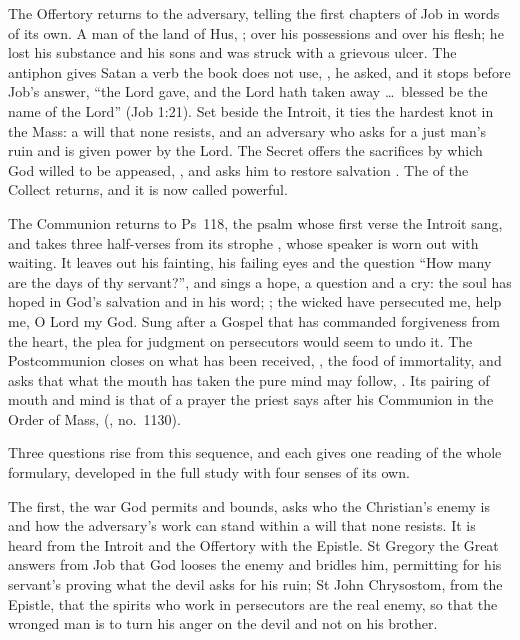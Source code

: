 The Offertory returns to the adversary, telling the first chapters of Job in
words of its own. A man of the land of Hus, ; 
over his possessions and over his flesh; he lost his substance and his sons and
was struck with a grievous ulcer. The antiphon gives Satan a verb the book does
not use, , he asked, and it stops before Job's answer, ``the Lord
gave, and the Lord hath taken away \dots\ blessed be the name of the Lord''
(Job 1:21). Set
beside the Introit, it ties the hardest knot in the Mass: a will that none
resists, and an adversary who asks for a just man's ruin and is given power by
the Lord. The Secret offers the sacrifices by which God willed to be appeased,
, and asks him to restore salvation
. The  of the Collect returns, and it is
now called powerful.

The Communion returns to Ps~118, the psalm whose first verse the Introit sang,
and takes three half-verses from its strophe , whose speaker is worn out with waiting. It leaves out his fainting, his failing
eyes and the question ``How many are the days of thy servant?'', and sings a
hope, a question and a cry: the soul has hoped in God's salvation and in his
word; ; the wicked have
persecuted me, help me, O Lord my God. Sung after a Gospel that has commanded
forgiveness from the heart, the plea for judgment on persecutors would seem to
undo it. The Postcommunion closes on what has been received,
, the food of immortality, and asks that what the
mouth has taken the pure mind may follow, . Its pairing of mouth and mind is that of a
prayer the priest says after his Communion in the Order of Mass,  (, no.~1130).

Three questions rise from this sequence, and each gives one reading of the
whole formulary, developed in the full study with four senses of its own.

The first, the war God permits and bounds, asks who the Christian's enemy is and how
the adversary's work can stand within a will that none resists. It is heard from
the Introit and the Offertory with the Epistle. St Gregory the Great answers
from Job that God looses the enemy and bridles him, permitting for his servant's
proving what the devil asks for his ruin; St John Chrysostom, from the Epistle,
that the spirits who work in persecutors are the real enemy, so that the wronged
man is to turn his anger on the devil and not on his brother.

